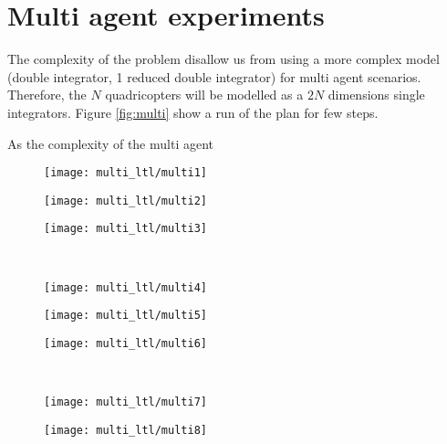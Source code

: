 \section{Multi agent experiments}
The complexity of the problem disallow us from using a more complex model (double integrator, 1 reduced double integrator) for multi agent scenarios.
Therefore, the $N$ quadricopters will be modelled as a $2N$ dimensions single integrators.
Figure \ref{fig:multi} show a run of the plan for few steps.

As the complexity of the multi agent 

\begin{figure}
  \newcommand*\FigVSkip{0.5em}
  \newcommand*\FigHSkip{0.1em}
  \newsavebox\FigBox
  \centering
  \begin{minipage}{0.3\textwidth}
    \centering
    \texttt{[image: multi\_ltl/multi1]}
  \end{minipage} 
  \begin{minipage}{0.3\textwidth}
    \centering
    \texttt{[image: multi\_ltl/multi2]}
  \end{minipage} 
  \begin{minipage}{0.3\textwidth}
    \centering
    \texttt{[image: multi\_ltl/multi3]}
  \end{minipage} 
  \\[\FigVSkip]%
  \begin{minipage}{0.3\textwidth}
    \centering
    \texttt{[image: multi\_ltl/multi4]}
  \end{minipage} 
  \begin{minipage}{0.3\textwidth}
    \centering
    \texttt{[image: multi\_ltl/multi5]}
  \end{minipage} 
  \begin{minipage}{0.3\textwidth}
    \centering
    \texttt{[image: multi\_ltl/multi6]}
  \end{minipage} 
  \\[\FigVSkip]%
  \begin{minipage}{0.3\textwidth}
    \centering
    \texttt{[image: multi\_ltl/multi7]}
  \end{minipage} 
  \begin{minipage}{0.3\textwidth}
    \centering
    \texttt{[image: multi\_ltl/multi8]}

\end{minipage}
\end{figure}
